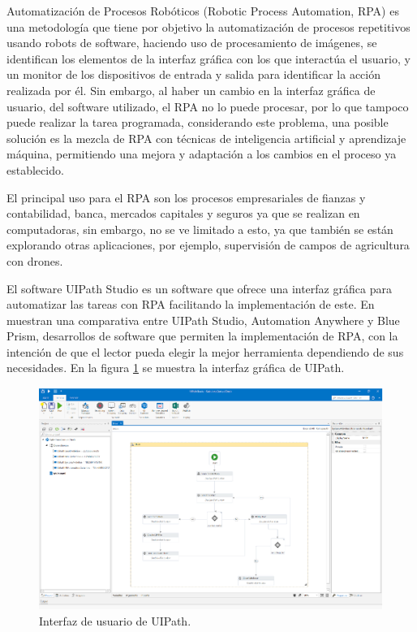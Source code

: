 Automatizaci\'on de Procesos Rob\'oticos (Robotic Process Automation, RPA) \cite{Bataller2017} es una metodolog\'ia que tiene por objetivo la automatizaci\'on de procesos repetitivos usando robots de software, haciendo uso de procesamiento de im\'agenes, se identifican los elementos de la interfaz gr\'afica con los que interact\'ua el usuario, y un monitor de los dispositivos de entrada y salida para identificar la acci\'on realizada por \'el\cite{Bataller2017}. Sin embargo, al haber un cambio en la interfaz gr\'afica de usuario, del software utilizado, el RPA no lo puede procesar, por lo que tampoco puede realizar la tarea programada, considerando este problema, una posible soluci\'on es la mezcla de RPA con t\'ecnicas de inteligencia artificial y aprendizaje m\'aquina, permitiendo una mejora y adaptaci\'on a los cambios en el proceso ya establecido\cite{vanderAalst2018, Mohanty2018}.


El principal uso para el RPA son los procesos empresariales de fianzas y
 contabilidad, banca, mercados capitales y seguros\cite{Mohanty2018} ya que 
 se realizan en computadoras, sin embargo, no se ve limitado a esto, ya que 
 tambi\'en se est\'an explorando otras aplicaciones, por ejemplo, 
 supervisi\'on de campos de agricultura con drones\cite{inbook}.
 

El software UIPath Studio es un software que ofrece una interfaz gr\'afica para automatizar las tareas con RPA facilitando la implementaci\'on de este\cite{Dines2018}. En \cite{8479511} muestran una comparativa entre UIPath Studio, Automation Anywhere y Blue Prism, desarrollos de software que permiten la implementaci\'on de RPA, con la intenci\'on de que el lector pueda elegir la mejor herramienta dependiendo de sus necesidades. En la figura \ref{fig:uipath} se muestra la interfaz gr\'afica de UIPath.

 
\begin{figure}[h]
\centering
\includegraphics[width=0.8\columnwidth]{chap2/Imagenes/rpauipath.eps}
\caption{Interfaz de usuario de UIPath\cite{Dines2018}.}
\label{fig:uipath}
\end{figure}